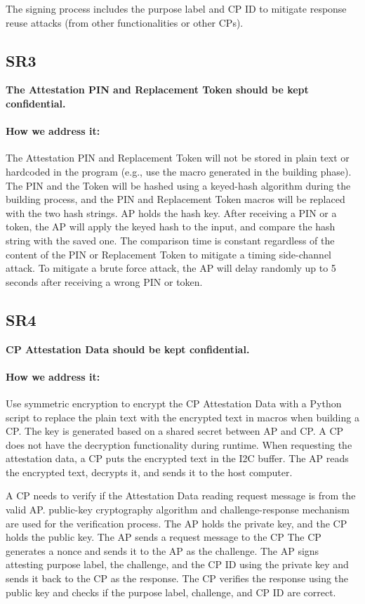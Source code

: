 \documentclass[11pt,oneside,onecolumn,letterpaper]{article}
\newcounter{alg}
\begin{document}
	The signing process includes the purpose label and CP ID to mitigate response reuse attacks (from other functionalities or other CPs).
	
	\subsection{SR3}
	\textbf{The Attestation PIN and Replacement Token should be kept confidential.}
	\paragraph{How we address it:}
	The Attestation PIN and Replacement Token will not be stored in plain text or hardcoded in the program (e.g., use the macro generated in the building phase).
	The PIN and the Token will be hashed using a keyed-hash algorithm during the building process,
	and the PIN and Replacement Token macros will be replaced with the two hash strings.
	AP holds the hash key.
	After receiving a PIN or a token,
	the AP will apply the keyed hash to the input,
	and compare the hash string with the saved one.
	The comparison time is constant regardless of the content of the PIN or Replacement Token to mitigate a timing side-channel attack.
	To mitigate a brute force attack,
	the AP will delay randomly up to 5 seconds after receiving a wrong PIN or token.
	
	\subsection{SR4}
	\textbf{CP Attestation Data should be kept confidential.}
	\paragraph{How we address it:}
	Use symmetric encryption to encrypt the CP Attestation Data with a Python script to replace the plain text with the encrypted text in macros when building a CP.
	The key is generated based on a shared secret between AP and CP.
	A CP does not have the decryption functionality during runtime.
	When requesting the attestation data,
	a CP puts the encrypted text in the I2C buffer.
	The AP reads the encrypted text,
	decrypts it,
	and sends it to the host computer.
	
	A CP needs to verify if the Attestation Data reading request message is from the valid AP.
	public-key cryptography algorithm and challenge-response mechanism are used for the verification process.
	The AP holds the private key,
	and the CP holds the public key.
	The AP sends a request message to the CP
	The CP generates a nonce and sends it to the AP as the challenge.
	The AP signs attesting purpose label,
	the challenge,
	and the CP ID using the private key and sends it back to the CP as the response.
	The CP verifies the response using the public key and checks if the purpose label,
	challenge,
	and CP ID are correct.
	
\end{document}
